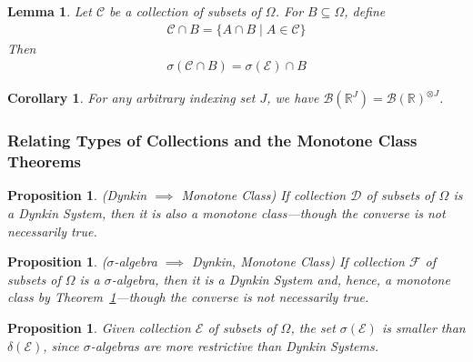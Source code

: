 \documentclass[12pt]{article}
\theoremstyle{plain}
\newtheorem{lem}[thm]{Lemma}
\newtheorem{prop}[thm]{Proposition}
\newtheorem{cor}[thm]{Corollary}
\theoremstyle{definition}
\theoremstyle{remark}
\newcommand{\sE}{\mathscr{E}}
\newcommand{\sF}{\mathscr{F}}
\newcommand{\sB}{\mathscr{B}}
\newcommand{\sC}{\mathscr{C}}
\newcommand{\sD}{\mathscr{D}}
\newcommand{\R}{\mathbb{R}}
\begin{document}
\begin{lem}
Let $\sC$ be a collection of subsets of $\Omega$. For $B\subseteq
\Omega$, define
\begin{align*}
  \sC \cap B = \{A \cap B \;|\; A \in \sC\}
\end{align*}
Then
\begin{align*}
  \sigma(\sC\cap B) = \sigma(\sE) \cap B
\end{align*}
\end{lem}
\begin{cor}
For any arbitrary indexing set $J$, we have
$\sB(\R^J)=\sB(\R)^{\otimes J}$.
\end{cor}



\subsubsection{Relating Types of Collections and the Monotone Class Theorems}

\begin{prop}\emph{(Dynkin $\implies$ Monotone Class)}
\label{prop:sal-mc}
If collection $\sD$ of subsets of $\Omega$ is a Dynkin System, then
it is also a monotone class---though the converse is not
necessarily true.
\end{prop}

\begin{prop}\emph{($\sigma$-algebra $\implies$ Dynkin, Monotone Class)}
\label{prop:sal-d}
If collection $\sF$ of subsets of $\Omega$ is a $\sigma$-algebra, then
it is a Dynkin System and, hence, a monotone class by
Theorem~\ref{prop:sal-mc}---though the converse is not necessarily true.
\end{prop}

\begin{prop}
Given collection $\sE$ of subsets of $\Omega$, the set $\sigma(\sE)$ is
smaller than $\delta(\sE)$, since $\sigma$-algebras are more
restrictive than Dynkin Systems.
\end{prop}
\end{document}

